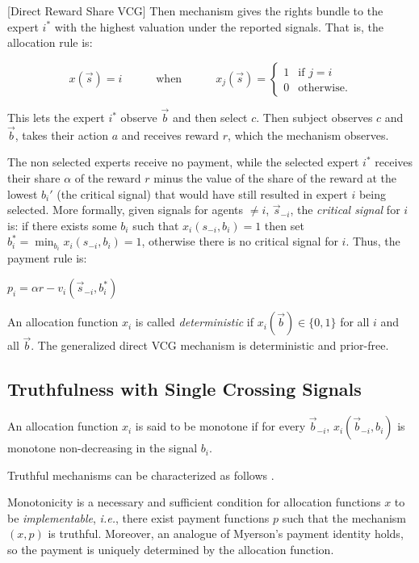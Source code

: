 \begin{mech}\label{mech:Direct}[Direct Reward Share VCG]
Then mechanism gives the rights bundle to the expert $i^*$ with the highest valuation under the reported signals. That is, the allocation rule is:

$$x(\vec{s}) = i \quad \quad\quad \text{when} \quad\quad\quad x_j(\vec{s}) = \begin{cases} 1 & \text{if } j=i \\ 0 & \text{otherwise.} \end{cases}$$

This lets the expert $i^*$ observe  $\vec{b}$ and then select $c$.
Then subject observes $c$ and $\vec{b}$, takes their action $a$ and receives reward $r$, which the mechanism observes. 

The non selected experts receive no payment, while the selected expert $i^*$ receives their share $\alpha$ of the reward $r$ minus the value of the share of the reward at the lowest $b_i'$ (the critical signal) that would have still resulted in expert $i$ being selected. 
More formally, given signals for agents $\neq i$, $\vec{s}_{-i}$, the {\sl critical signal} for $i$ is: if there exists some $b_i$ such that $x_i(s_{-i},b_i)=1$ then set $b_i^*=\min_{b_i} x_i(s_{-i},b_i)=1$, otherwise there is no critical signal for $i$.
Thus, the payment rule is:

$p_i= \alpha r - v_i(\vec{s}_{-i},b_i^*)$

\end{mech}

An allocation function $x_i$ is called {\sl deterministic} if $x_i(\vec{b})\in \{0,1\}$ for all $i$ and all $\vec{b}$.
The generalized direct VCG mechanism is deterministic and prior-free.

\subsection{Truthfulness with Single Crossing Signals}

\begin{defn}[Monotonicity]
	An allocation function $x_i$ is said to be monotone if for every $\vec{b}_{-i}$, $x_i(\vec{b}_{-i},b_i)$ is monotone non-decreasing in the signal $b_i$.
\end{defn}

Truthful mechanisms can be characterized as follows \cite{roughgarden2016optimal}.

\begin{prop}\label{prop:char-ic}
	Monotonicity is a necessary and sufficient condition for allocation functions $x$ to be \emph{implementable}, {\sl i.e.}, there exist payment functions $p$ such that the mechanism $(x,p)$ is truthful.  Moreover, an analogue of Myerson's payment identity holds, so the payment is uniquely determined by the allocation function.
\end{prop}

